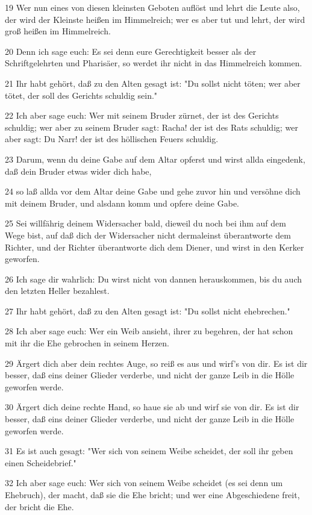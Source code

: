 \par 19 Wer nun eines von diesen kleinsten Geboten auflöst und lehrt die Leute also, der wird der Kleinste heißen im Himmelreich; wer es aber tut und lehrt, der wird groß heißen im Himmelreich.
\par 20 Denn ich sage euch: Es sei denn eure Gerechtigkeit besser als der Schriftgelehrten und Pharisäer, so werdet ihr nicht in das Himmelreich kommen.
\par 21 Ihr habt gehört, daß zu den Alten gesagt ist: "Du sollst nicht töten; wer aber tötet, der soll des Gerichts schuldig sein."
\par 22 Ich aber sage euch: Wer mit seinem Bruder zürnet, der ist des Gerichts schuldig; wer aber zu seinem Bruder sagt: Racha! der ist des Rats schuldig; wer aber sagt: Du Narr! der ist des höllischen Feuers schuldig.
\par 23 Darum, wenn du deine Gabe auf dem Altar opferst und wirst allda eingedenk, daß dein Bruder etwas wider dich habe,
\par 24 so laß allda vor dem Altar deine Gabe und gehe zuvor hin und versöhne dich mit deinem Bruder, und alsdann komm und opfere deine Gabe.
\par 25 Sei willfährig deinem Widersacher bald, dieweil du noch bei ihm auf dem Wege bist, auf daß dich der Widersacher nicht dermaleinst überantworte dem Richter, und der Richter überantworte dich dem Diener, und wirst in den Kerker geworfen.
\par 26 Ich sage dir wahrlich: Du wirst nicht von dannen herauskommen, bis du auch den letzten Heller bezahlest.
\par 27 Ihr habt gehört, daß zu den Alten gesagt ist: "Du sollst nicht ehebrechen."
\par 28 Ich aber sage euch: Wer ein Weib ansieht, ihrer zu begehren, der hat schon mit ihr die Ehe gebrochen in seinem Herzen.
\par 29 Ärgert dich aber dein rechtes Auge, so reiß es aus und wirf's von dir. Es ist dir besser, daß eins deiner Glieder verderbe, und nicht der ganze Leib in die Hölle geworfen werde.
\par 30 Ärgert dich deine rechte Hand, so haue sie ab und wirf sie von dir. Es ist dir besser, daß eins deiner Glieder verderbe, und nicht der ganze Leib in die Hölle geworfen werde.
\par 31 Es ist auch gesagt: "Wer sich von seinem Weibe scheidet, der soll ihr geben einen Scheidebrief."
\par 32 Ich aber sage euch: Wer sich von seinem Weibe scheidet (es sei denn um Ehebruch), der macht, daß sie die Ehe bricht; und wer eine Abgeschiedene freit, der bricht die Ehe.

